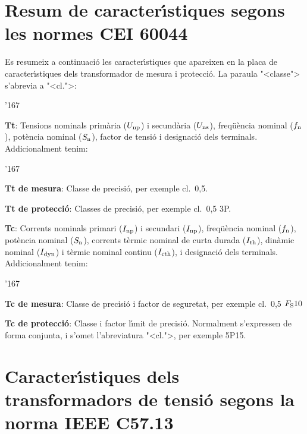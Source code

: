 \section{Resum de caracter\'{\i}stiques segons les normes \textsf{CEI 60044}}

Es resumeix a continuaci\'{o} les caracter\'{\i}stiques que apareixen en la placa de caracter\'{\i}stiques dels transformador de mesura i protecci\'{o}. La paraula
{"<}classe{">} s'abrevia a {"<}cl.{">}:

\begin{dinglist}{'167}
   \item \textbf{Tt}: Tensions nominals  prim\`{a}ria ($U_\mathrm{np}$) i secund\`{a}ria ($U_\mathrm{ns}$), freq\"{u}\`{e}ncia nominal ($f_\mathrm{n}$),
    pot\`{e}ncia nominal ($S_\mathrm{n}$), factor de tensi\'{o} i     designaci\'{o} dels terminals. Addicionalment tenim:
       \begin{dinglist}{'167}
           \item \textbf{Tt de mesura}: Classe de precisi\'{o}, per  exemple cl.~0,5.
           \item \textbf{Tt de protecci\'{o}}: Classes de precisi\'{o}, per  exemple cl.~0,5 3P.
        \end{dinglist}
    \item \textbf{Tc}: Corrents nominals primari ($I_\mathrm{np}$) i secundari ($I_\mathrm{np}$), freq\"{u}\`{e}ncia nominal ($f_\mathrm{n}$),
     pot\`{e}ncia nominal ($S_\mathrm{n}$),  corrents t\`{e}rmic nominal de curta durada ($I_\mathrm{th}$), din\`{a}mic nominal ($I_\mathrm{dyn}$) i t\`{e}rmic nominal continu ($I_\mathrm{cth}$), i     designaci\'{o} dels terminals. Addicionalment tenim:
        \begin{dinglist}{'167}
           \item \textbf{Tc de mesura}: Classe de precisi\'{o} i factor de seguretat, per exemple cl.~0,5 $F_\mathrm{S} 10$
           \item \textbf{Tc de protecci\'{o}}: Classe i factor l\'{\i}mit de precisi\'{o}. Normalment s'expressen de forma conjunta, i s'omet l'abreviatura {"<}cl.{">},  per exemple 5P15.
        \end{dinglist}
\end{dinglist}


\section{Caracter\'{\i}stiques dels transformadors de tensi\'{o} segons la norma \textsf{IEEE C57.13}}

